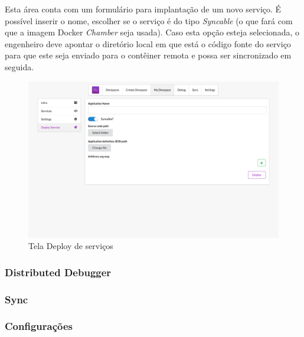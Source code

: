 Esta área conta com um formulário para implantação de um novo serviço. É possível inserir o nome, escolher se o serviço é do tipo \textit{Syncable} (o que fará com que a imagem Docker \textit{Chamber} seja usada). Caso esta opção esteja selecionada, o engenheiro deve apontar o diretório local em que está o código fonte do serviço para que este seja enviado para o contêiner remota e possa ser sincronizado em seguida.

\begin{figure}[htb]
	\caption{\label{fig_frontnd_deploy}Tela Deploy de serviços}
	\begin{center}
	\includegraphics[width=\textwidth,keepaspectratio]{pictures/frontend/frontend-deploy.png}
	\end{center}
\end{figure}

\subsubsection{Distributed Debugger}

\subsubsection{Sync}

\subsubsection{Configurações}

